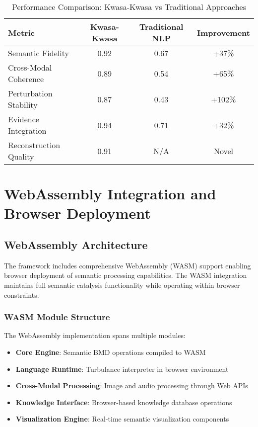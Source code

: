 \documentclass[12pt,a4paper,twoside]{article}
\begin{document}
\begin{itemize}
\begin{table}[h]
\centering
\begin{tabular}{|l|c|c|c|}
\hline
\textbf{Metric} & \textbf{Kwasa-Kwasa} & \textbf{Traditional NLP} & \textbf{Improvement} \\
\hline
Semantic Fidelity & 0.92 & 0.67 & +37\% \\
Cross-Modal Coherence & 0.89 & 0.54 & +65\% \\
Perturbation Stability & 0.87 & 0.43 & +102\% \\
Evidence Integration & 0.94 & 0.71 & +32\% \\
Reconstruction Quality & 0.91 & N/A & Novel \\
\hline
\end{tabular}
\caption{Performance Comparison: Kwasa-Kwasa vs Traditional Approaches}
\end{table}

\section{WebAssembly Integration and Browser Deployment}

\subsection{WebAssembly Architecture}

The framework includes comprehensive WebAssembly (WASM) support enabling browser deployment of semantic processing capabilities. The WASM integration maintains full semantic catalysis functionality while operating within browser constraints.

\subsubsection{WASM Module Structure}

The WebAssembly implementation spans multiple modules:

\begin{itemize}
\item \textbf{Core Engine}: Semantic BMD operations compiled to WASM
\item \textbf{Language Runtime}: Turbulance interpreter in browser environment
\item \textbf{Cross-Modal Processing}: Image and audio processing through Web APIs
\item \textbf{Knowledge Interface}: Browser-based knowledge database operations
\item \textbf{Visualization Engine}: Real-time semantic visualization components
\end{itemize}


\end{itemize}
\end{document}
